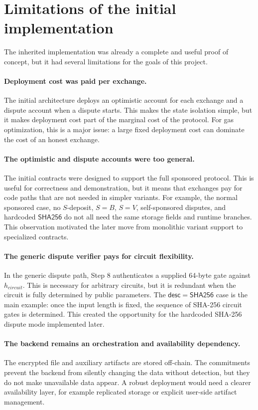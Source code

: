 \section{Limitations of the initial implementation}

The inherited implementation was already a complete and useful proof of concept, but it had
several limitations for the goals of this project.

\paragraph{Deployment cost was paid per exchange.}
The initial architecture deploys an optimistic account for each exchange and a dispute
account when a dispute starts. This makes the state isolation simple, but it makes deployment
cost part of the marginal cost of the protocol. For gas optimization, this is a major issue:
a large fixed deployment cost can dominate the cost of an honest exchange.

\paragraph{The optimistic and dispute accounts were too general.}
The initial contracts were designed to support the full sponsored protocol. This is useful
for correctness and demonstration, but it means that exchanges pay for code paths that are
not needed in simpler variants. For example, the normal sponsored case, no \(S\)-deposit,
\(S=B\), \(S=V\), self-sponsored disputes, and hardcoded \(\mathsf{SHA256}\) do not all need
the same storage fields and runtime branches. This observation motivated the later move from
monolithic variant support to specialized contracts.

\paragraph{The generic dispute verifier pays for circuit flexibility.}
In the generic dispute path, Step 8 authenticates a supplied 64-byte gate against
\(h_{circuit}\). This is necessary for arbitrary circuits, but it is redundant when the
circuit is fully determined by public parameters. The \(\mathsf{desc}=\mathsf{SHA256}\)
case is the main example: once the input length is fixed, the sequence of SHA-256 circuit
gates is determined. This created the opportunity for the hardcoded SHA-256 dispute mode
implemented later.

\paragraph{The backend remains an orchestration and availability dependency.}
The encrypted file and auxiliary artifacts are stored off-chain. The commitments prevent the
backend from silently changing the data without detection, but they do not make unavailable
data appear. A robust deployment would need a clearer availability layer, for example
replicated storage or explicit user-side artifact management.


